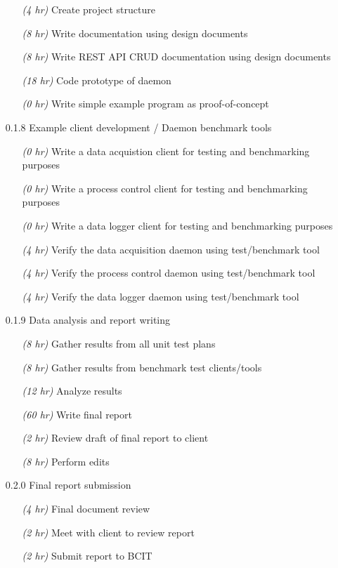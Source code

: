 \begin{itemize}
\begin{itemize}
          \item[\emph{(4 hr)}] Create project structure
          \item[\emph{(8 hr)}] Write documentation using design documents
          \item[\emph{(8 hr)}] Write REST API CRUD documentation using design documents
          \item[\emph{(18 hr)}] Code prototype of daemon
          \item[\emph{(0 hr)}] Write simple example program as proof-of-concept
        \end{itemize}
      \item[0.1.8] Example client development / Daemon benchmark tools
        \begin{itemize}
          \item[\emph{(0 hr)}] Write a data acquistion client for testing and benchmarking purposes
          \item[\emph{(0 hr)}] Write a process control client for testing and benchmarking purposes
          \item[\emph{(0 hr)}] Write a data logger client for testing and benchmarking purposes
          \item[\emph{(4 hr)}] Verify the data acquisition daemon using test/benchmark tool
          \item[\emph{(4 hr)}] Verify the process control daemon using test/benchmark tool
          \item[\emph{(4 hr)}] Verify the data logger daemon using test/benchmark tool
        \end{itemize}
      \item[0.1.9] Data analysis and report writing
        \begin{itemize}
          \item[\emph{(8 hr)}] Gather results from all unit test plans
          \item[\emph{(8 hr)}] Gather results from benchmark test clients/tools
          \item[\emph{(12 hr)}] Analyze results
          \item[\emph{(60 hr)}] Write final report
          \item[\emph{(2 hr)}] Review draft of final report to client
          \item[\emph{(8 hr)}] Perform edits
        \end{itemize}
      \item[0.2.0] Final report submission
        \begin{itemize}
          \item[\emph{(4 hr)}] Final document review
          \item[\emph{(2 hr)}] Meet with client to review report
          \item[\emph{(2 hr)}] Submit report to BCIT
        \end{itemize}
    \end{itemize}

